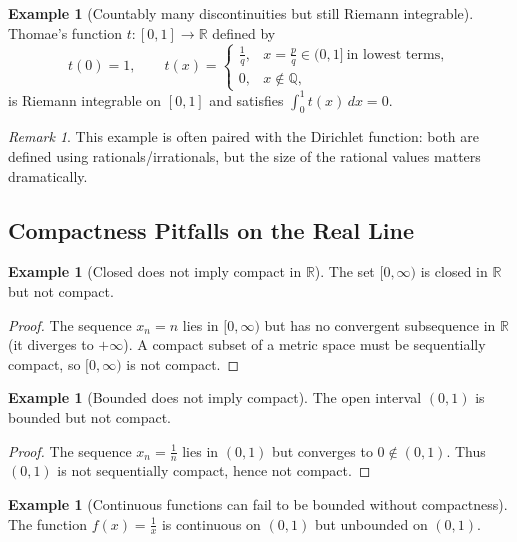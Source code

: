 \documentclass[12pt]{article}
\numberwithin{equation}{section}
\def\diff{d}
\newcommand{\RR}{\mathbb{R}}
\newcommand{\QQ}{\mathbb{Q}}
\newcommand{\diff}{\mathop{}\!\mathrm{d}}    %
\newcommand{\casesm}[1]{\begin{cases}#1\end{cases}}
\theoremstyle{plain}
\theoremstyle{definition}
\newtheorem{example}[theorem]{Example}
\theoremstyle{remark}
\newtheorem{remark}[theorem]{Remark}
\begin{document}
\begin{example}[Countably many discontinuities but still Riemann integrable]\label{ex:app_thomae}
Thomae's function $t:[0,1]\to\RR$ defined by
\[
t(0)=1,\qquad
t(x)=
\casesm{
\frac{1}{q}, & x=\frac{p}{q}\in(0,1]\ \text{in lowest terms},\\
0, & x\notin\QQ,
}
\]
is Riemann integrable on $[0,1]$ and satisfies $\int_0^1 t(x)\,\diff x=0$.
\end{example}

\begin{remark}
This example is often paired with the Dirichlet function:
both are defined using rationals/irrationals, but the size of the rational values matters dramatically.
\end{remark}

\subsection{Compactness Pitfalls on the Real Line}

\begin{example}[Closed does not imply compact in $\RR$]\label{ex:app_closed_not_compact}
The set $[0,\infty)$ is closed in $\RR$ but not compact.
\end{example}

\begin{proof}
The sequence $x_n=n$ lies in $[0,\infty)$ but has no convergent subsequence in $\RR$ (it diverges to $+\infty$).
A compact subset of a metric space must be sequentially compact, so $[0,\infty)$ is not compact.
\end{proof}

\begin{example}[Bounded does not imply compact]\label{ex:app_bounded_not_compact}
The open interval $(0,1)$ is bounded but not compact.
\end{example}

\begin{proof}
The sequence $x_n=\frac{1}{n}$ lies in $(0,1)$ but converges to $0\notin(0,1)$.
Thus $(0,1)$ is not sequentially compact, hence not compact.
\end{proof}

\begin{example}[Continuous functions can fail to be bounded without compactness]\label{ex:app_unbounded_cont}
The function $f(x)=\frac{1}{x}$ is continuous on $(0,1)$ but unbounded on $(0,1)$.
\end{example}
\end{document}
